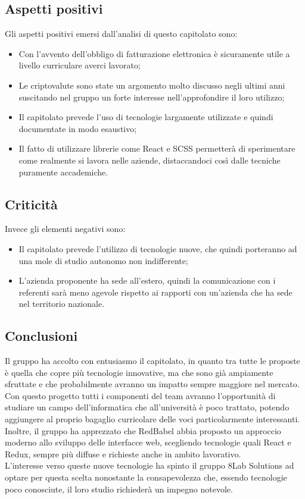\subsection{Aspetti positivi}
Gli aspetti positivi emersi dall'analisi di questo capitolato sono:
\begin{itemize}
	\item Con l'avvento dell'obbligo di fatturazione elettronica è sicuramente
	utile a livello curriculare averci lavorato;
	\item Le criptovalute sono state un argomento molto discusso negli ultimi anni 
suscitando nel gruppo un forte interesse nell'approfondire il loro utilizzo;
	\item Il capitolato prevede l'uso di tecnologie largamente utilizzate e quindi 
documentate in modo esaustivo;
	\item Il fatto di utilizzare librerie come React e SCSS permetterà di
	sperimentare come realmente si lavora nelle aziende, distaccandoci così dalle 
tecniche puramente accademiche.
\end{itemize}

\subsection{Criticità}
Invece gli elementi negativi sono:
\begin{itemize}
	\item Il capitolato prevede l'utilizzo di tecnologie nuove, che quindi 
porteranno ad una mole di studio autonomo non indifferente;
	\item L'azienda proponente ha sede all'estero, quindi la comunicazione con i 
referenti sarà meno agevole rispetto ai rapporti con un'azienda che ha sede nel 
territorio nazionale.
\end{itemize}

\subsection{Conclusioni} Il gruppo ha accolto con entusiasmo il capitolato, in 
quanto tra tutte le proposte è quella che copre più tecnologie innovative, ma 
che sono già ampiamente sfruttate e che probabilmente avranno un impatto sempre 
maggiore nel mercato. Con questo progetto tutti i componenti del team avranno 
l'opportunità di studiare un campo dell'informatica che all'università è poco 
trattato, potendo aggiungere al proprio bagaglio curricolare delle voci 
particolarmente interessanti. Inoltre, il gruppo ha apprezzato che RedBabel abbia
proposto un approccio moderno allo sviluppo delle interfacce web, scegliendo 
tecnologie quali React e Redux, sempre più diffuse e richieste anche in ambito lavorativo.\\
L'interesse verso queste nuove tecnologie ha spinto il gruppo 8Lab Solutions ad 
optare per questa scelta nonostante la consapevolezza che, essendo tecnologie 
poco conosciute, il loro studio richiederà un impegno notevole.


